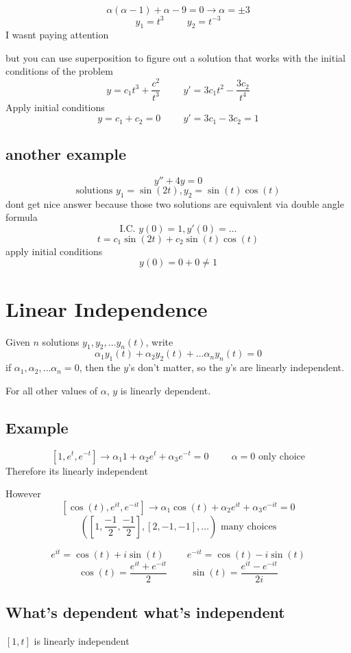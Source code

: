 \documentclass[fleqn]{report}
\newcommand{\hp}{\hspace{1cm}}
\begin{document}
\[
\alpha (\alpha - 1)
+
\alpha
-
9
=
0
\rightarrow
\alpha = \pm 3
\]
\[
y_1 = t^3
\hp
y_2 = t^{-3}
\]
I wasnt paying attention

but you can use superposition to figure out a solution that works with the initial conditions of the problem
\[
y = c_1t^3 + \frac{c^2}{t^3}
\hp
y' = 3c_1t^2 - \frac{3c_2}{t^4}
\]
Apply initial conditions
\[
y = c_1 + c_2 = 0
\hp
y' = 3c_1- 3c_2 = 1
\]


\subsection{another example}
\[
y'' + 4y = 0
\]
\[
\textrm{solutions } 
y_1 = \sin (2t),
y_2 = \sin(t) \cos(t)
\]
dont get nice answer because those two solutions are equivalent via double angle formula
\[
\textrm{I.C. } 
y(0) = 1, y'(0) = \ldots
\]
\[
t = c_1 \sin(2t) + c_2 \sin (t) \cos (t)
\]
apply initial conditions
\[
y(0) = 0 + 0 \neq 1
\]




\section{Linear Independence}
Given $n$ solutions $y_1, y_2, \ldots y_n(t)$, write
\[
\alpha_1 y_1(t) + \alpha_2 y_2(t) + \ldots \alpha_n y_n(t) = 0
\]
if $\alpha_1, \alpha_2, \ldots \alpha_n = 0$, then the $y$'s don't matter, so the $y$'s are linearly independent.

For all other values of $\alpha$, $y$ is linearly dependent.

\subsection{Example}
\[
[ 1, e^t, e^{-t} ]
\rightarrow
\alpha_1 1 + \alpha_2 e^t + \alpha_3 e^{-t} = 0
\hp
\alpha = 0 \textrm{ only choice}
\]
Therefore its linearly independent

However
\[
[ \cos(t), e^{it}, e^{-it} ]
\rightarrow
\alpha_1 \cos(t) + \alpha_2 e^{it} + \alpha_3 e^{-it} = 0
\]
\[
([1, \frac{-1}{2}, \frac{-1}{2}], [2, -1, -1], \ldots) \textrm{ many choices}
\]


\[
e^{it} = \cos(t) + i\sin (t)
\hp
e^{-it} = \cos(t) - i\sin (t)
\]
\[
\cos(t) = \frac{e^{it} + e^{-it}}{2}
\hp
\sin(t) = \frac{e^{it} - e^{-it}}{2i}
\]


\subsection{What's dependent what's independent}
$[1, t]$ is linearly independent
\end{document}
